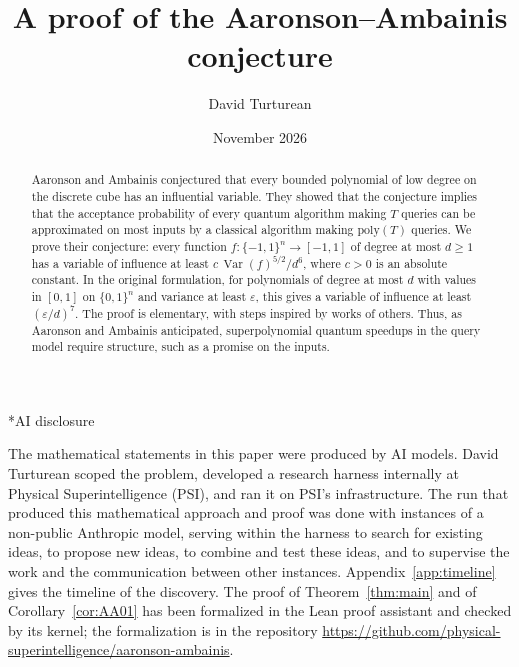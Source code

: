 \documentclass[11pt,reqno]{amsart}
\makeatletter
\newcommand{\modelname}{a non-public Anthropic model}
\theoremstyle{definition}
\theoremstyle{remark}
\numberwithin{equation}{section}
\theoremstyle{named}
\theoremstyle{plain}
\renewcommand{\section}{\@startsection{section}{1}%
  \z@{1.3\linespacing\@plus.7\linespacing}{.65\linespacing}{\normalfont\scshape\centering}}
\newcommand{\Var}{\operatorname{Var}}
\newcommand{\eps}{\varepsilon}
\makeatother
\begin{document}
\title[A proof of the Aaronson--Ambainis conjecture]{A proof of the Aaronson--Ambainis conjecture}

\author{David Turturean}
\date{November 2026}


\begin{abstract}
Aaronson and Ambainis conjectured that every bounded polynomial of low degree on the discrete cube
has an influential variable. They showed that the conjecture implies that the acceptance probability
of every quantum algorithm making $T$ queries can be approximated on most inputs by a classical
algorithm making $\mathrm{poly}(T)$ queries. We prove their conjecture: every function
$f\colon\{-1,1\}^n\to[-1,1]$ of degree at most $d\ge1$ has a variable of influence at least
$c\,\Var(f)^{5/2}/d^{6}$, where $c>0$ is an absolute constant. In the original formulation, for
polynomials of degree at most $d$ with values in $[0,1]$ on $\{0,1\}^n$ and variance at least
$\eps$, this gives a variable of influence at least $(\eps/d)^{7}$. The proof is elementary, with
steps inspired by works of others. Thus, as Aaronson and Ambainis anticipated, superpolynomial quantum
speedups in the query model require structure, such as a promise on the inputs.
\end{abstract}

\maketitle

\clearpage
\vspace*{\fill}
\section*{AI disclosure}

The mathematical statements in this paper were produced by AI models.
David Turturean scoped the problem, developed a research harness internally at Physical
Superintelligence (PSI), and ran it on PSI's infrastructure. The run that produced this mathematical
approach and proof was done with instances of
\modelname, serving within the harness to search for existing ideas, to propose new ideas, to combine
and test these ideas, and to supervise the work and the communication between other instances.
Appendix~\ref{app:timeline} gives the timeline of the discovery.
The proof of Theorem~\ref{thm:main} and of Corollary~\ref{cor:AA01} has been formalized in the
Lean proof assistant and checked by its kernel; the formalization is in the repository
\url{https://github.com/physical-superintelligence/aaronson-ambainis}.
\end{document}
